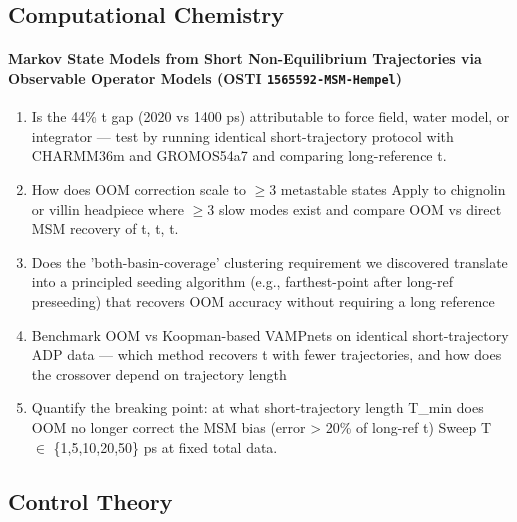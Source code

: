 \subsection*{Computational Chemistry}
\paragraph{Markov State Models from Short Non-Equilibrium Trajectories via Observable Operator Models \textnormal{\small(OSTI \texttt{1565592-MSM-Hempel})}}
\begin{enumerate}[leftmargin=1.6em,itemsep=0.2em,topsep=0.2em,label=Q\arabic*.]
\item Is the 44\% t gap (2020 vs 1400 ps) attributable to force field, water model, or integrator --- test by running identical short-trajectory protocol with CHARMM36m and GROMOS54a7 and comparing long-reference t.
\item How does OOM correction scale to $\geq$3 metastable states Apply to chignolin or villin headpiece where $\geq$3 slow modes exist and compare OOM vs direct MSM recovery of t, t, t.
\item Does the 'both-basin-coverage' clustering requirement we discovered translate into a principled seeding algorithm (e.g., farthest-point after long-ref preseeding) that recovers OOM accuracy without requiring a long reference
\item Benchmark OOM vs Koopman-based VAMPnets on identical short-trajectory ADP data --- which method recovers t with fewer trajectories, and how does the crossover depend on trajectory length
\item Quantify the breaking point: at what short-trajectory length T\_min does OOM no longer correct the MSM bias (error \textgreater{} 20\% of long-ref t) Sweep T $\in$ \{1,5,10,20,50\} ps at fixed total data.
\end{enumerate}
\subsection*{Control Theory}
